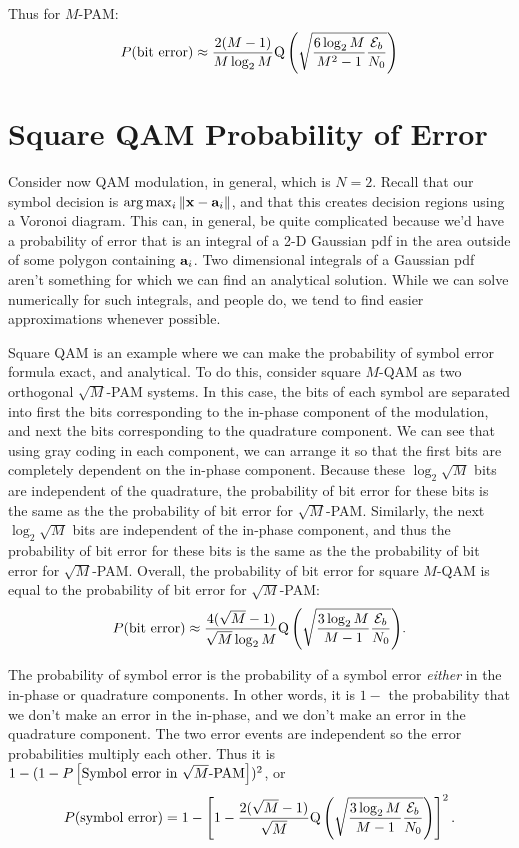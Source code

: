 Thus for $M$-PAM:
\begin{equation} \label{E:PrBitErrorMPAM2}
  P(\mbox{bit error}) \approx \frac{2(M-1)}{M \log_2 M} {\mbox{Q}\left( {\sqrt{\frac{6 \log_2 M}{M^2-1} \frac{\mathcal{E}_b}{N_0}}} \right)}
\end{equation}


\section{Square QAM Probability of Error}


Consider now QAM modulation, in general, which is $N=2$.
Recall that our symbol decision is  $\arg \max_i \| \mathbf{x} - \mathbf{a}_i \|$, and that this creates decision regions using a Voronoi diagram.  This can, in general, be quite complicated because we'd have a probability of error that is an integral of a 2-D Gaussian pdf in the area outside of some polygon containing $\mathbf{a}_i$.  Two dimensional integrals of a Gaussian pdf aren't something for which we can find an analytical solution.  While we can solve numerically for such integrals, and people do, we tend to find easier approximations whenever possible.

Square QAM is an example where we can make the probability of symbol error formula exact, and analytical.  To do this, consider square $M$-QAM as two orthogonal $\sqrt{M}$-PAM systems.  In this case, the bits of each symbol are separated into first the bits corresponding to the in-phase component of the modulation, and next the bits corresponding to the quadrature component.  We can see that using gray coding in each component, we can arrange it so that the first bits are completely dependent on the in-phase component.  Because these $\log_2 \sqrt{M}$ bits are independent of the quadrature, the probability of bit error for these bits is the same as the the probability of bit error for $\sqrt{M}$-PAM.  Similarly, the next $\log_2 \sqrt{M}$ bits are independent of the in-phase component, and thus the probability of bit error for these bits is the same as the the probability of bit error for $\sqrt{M}$-PAM.  Overall, the probability of bit error for square $M$-QAM is equal to the probability of bit error for $\sqrt{M}$-PAM:
\begin{equation} \label{E:PrBitErrorMPAM}
  P(\mbox{bit error}) \approx \frac{4(\sqrt{M}-1)}{\sqrt{M} \log_2 M} {\mbox{Q}\left( {\sqrt{\frac{3 \log_2 M}{M-1} \frac{\mathcal{E}_b}{N_0}}} \right)}.
\end{equation}


The probability of symbol error is the probability of a symbol error \emph{either} in the in-phase or quadrature components.  In other words, it is $1-$ the probability that we don't make an error in the in-phase, and we don't make an error in the quadrature component.  The two error events are independent so the error probabilities multiply each other.    Thus it is $1 - (1-P\left[{\mbox{Symbol error in }\sqrt{M}\mbox{-PAM}}\right])^2$, or
\[
 P(\mbox{symbol error}) = 1-\left[
   1-\frac{2(\sqrt{M}-1)}{\sqrt{M}} {\mbox{Q}\left( {\sqrt{\frac{3 \log_2 M}{M-1} \frac{\mathcal{E}_b}{N_0}}} \right)}
 \right]^2.
\]